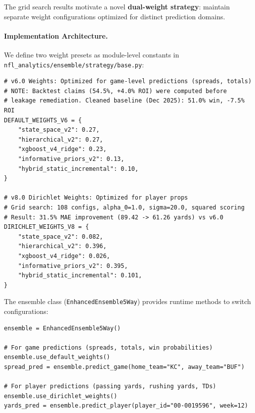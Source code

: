 The grid search results motivate a novel \textbf{dual-weight strategy}: maintain separate weight configurations optimized for distinct prediction domains.

\paragraph{Implementation Architecture.}
We define two weight presets as module-level constants in \texttt{nfl\_analytics/ensemble/strategy/base.py}:
\begin{verbatim}
# v6.0 Weights: Optimized for game-level predictions (spreads, totals)
# NOTE: Backtest claims (54.5%, +4.0% ROI) were computed before
# leakage remediation. Cleaned baseline (Dec 2025): 51.0% win, -7.5% ROI
DEFAULT_WEIGHTS_V6 = {
    "state_space_v2": 0.27,
    "hierarchical_v2": 0.27,
    "xgboost_v4_ridge": 0.23,
    "informative_priors_v2": 0.13,
    "hybrid_static_incremental": 0.10,
}

# v8.0 Dirichlet Weights: Optimized for player props
# Grid search: 108 configs, alpha_0=1.0, sigma=20.0, squared scoring
# Result: 31.5% MAE improvement (89.42 -> 61.26 yards) vs v6.0
DIRICHLET_WEIGHTS_V8 = {
    "state_space_v2": 0.082,
    "hierarchical_v2": 0.396,
    "xgboost_v4_ridge": 0.026,
    "informative_priors_v2": 0.395,
    "hybrid_static_incremental": 0.101,
}
\end{verbatim}

The ensemble class (\texttt{EnhancedEnsemble5Way}) provides runtime methods to switch configurations:
\begin{verbatim}
ensemble = EnhancedEnsemble5Way()

# For game predictions (spreads, totals, win probabilities)
ensemble.use_default_weights()
spread_pred = ensemble.predict_game(home_team="KC", away_team="BUF")

# For player predictions (passing yards, rushing yards, TDs)
ensemble.use_dirichlet_weights()
yards_pred = ensemble.predict_player(player_id="00-0019596", week=12)
\end{verbatim}

